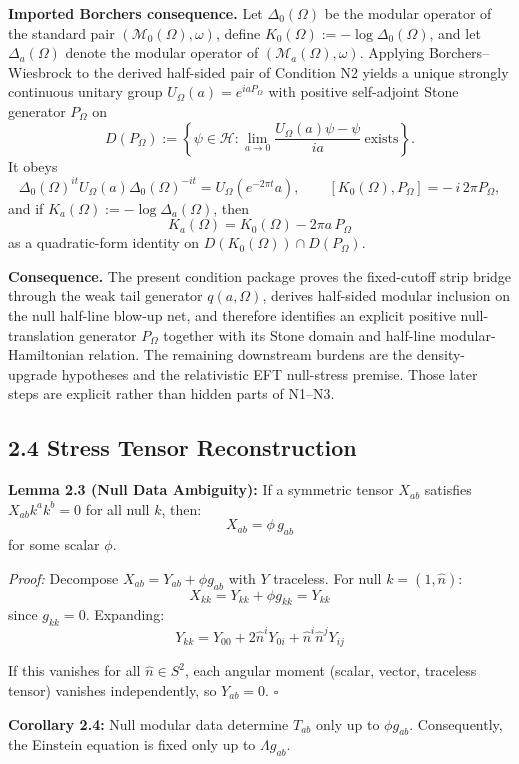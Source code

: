 \textbf{Imported Borchers consequence.} Let \(\Delta_0(\Omega)\) be the modular operator of the standard pair \((\mathcal M_0(\Omega),\omega)\), define \(K_0(\Omega):=-\log \Delta_0(\Omega)\), and let \(\Delta_a(\Omega)\) denote the modular operator of \((\mathcal M_a(\Omega),\omega)\). Applying Borchers--Wiesbrock to the derived half-sided pair of Condition N2 yields a unique strongly continuous unitary group \(U_\Omega(a)=e^{iaP_\Omega}\) with positive self-adjoint Stone generator \(P_\Omega\) on
\[
D(P_\Omega)
:=
\left\{
\psi\in\mathcal H:
\lim_{a\to0}\frac{U_\Omega(a)\psi-\psi}{ia}\ \text{exists}
\right\}.
\]
It obeys
\[
\Delta_0(\Omega)^{it}U_\Omega(a)\Delta_0(\Omega)^{-it}
=
U_\Omega(e^{-2\pi t}a),
\qquad
[K_0(\Omega),P_\Omega]=-\,i\,2\pi P_\Omega,
\]
and if \(K_a(\Omega):=-\log \Delta_a(\Omega)\), then
\[
K_a(\Omega)=K_0(\Omega)-2\pi a\,P_\Omega
\]
as a quadratic-form identity on \(D(K_0(\Omega))\cap D(P_\Omega)\).

\textbf{Consequence.} The present condition package proves the fixed-cutoff strip bridge through the weak tail generator \(q(a,\Omega)\), derives half-sided modular inclusion on the null half-line blow-up net, and therefore identifies an explicit positive null-translation generator \(P_\Omega\) together with its Stone domain and half-line modular-Hamiltonian relation. The remaining downstream burdens are the density-upgrade hypotheses and the relativistic EFT null-stress premise. Those later steps are explicit rather than hidden parts of N1--N3.
\subsection{2.4 Stress Tensor Reconstruction}\label{24-stress-tensor-reconstruction}

\textbf{Lemma 2.3 (Null Data Ambiguity):} If a symmetric tensor \(X_{ab}\) satisfies \(X_{ab}k^a k^b = 0\) for all null \(k\), then: \[X_{ab} = \phi \, g_{ab}\] for some scalar \(\phi\).

\emph{Proof:} Decompose \(X_{ab} = Y_{ab} + \phi g_{ab}\) with \(Y\) traceless. For null \(k = (1, \hat{n})\): \[X_{kk} = Y_{kk} + \phi g_{kk} = Y_{kk}\] since \(g_{kk} = 0\). Expanding: \[Y_{kk} = Y_{00} + 2\hat{n}^i Y_{0i} + \hat{n}^i \hat{n}^j Y_{ij}\]

If this vanishes for all \(\hat{n} \in S^2\), each angular moment (scalar, vector, traceless tensor) vanishes independently, so \(Y_{ab} = 0\). \(\square\)

\textbf{Corollary 2.4:} Null modular data determine \(T_{ab}\) only up to \(\phi g_{ab}\). Consequently, the Einstein equation is fixed only up to \(\Lambda g_{ab}\).

